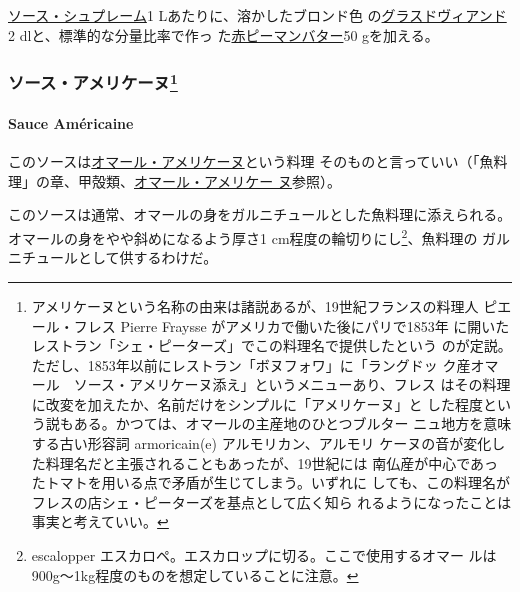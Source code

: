 \begin{recette}
\protect\hyperlink{sauce-supreme}{ソース・シュプレーム}1
Lあたりに、溶かしたブロンド色
の\protect\hyperlink{glace-de-viande}{グラスドヴィアンド}2
dlと、標準的な分量比率で作っ た\href{}{赤ピーマンバター}50 gを加える。

\maeaki

\hypertarget{ux30bdux30fcux30b9ux30a2ux30e1ux30eaux30b1ux30fcux30cc3}{%
\subsubsection[ソース・アメリケーヌ]{\texorpdfstring{ソース・アメリケーヌ\footnote{アメリケーヌという名称の由来は諸説あるが、19世紀フランスの料理人
  ピエール・フレス Pierre Fraysse がアメリカで働いた後にパリで1853年
  に開いたレストラン「シェ・ピーターズ」でこの料理名で提供したという
  のが定説。ただし、1853年以前にレストラン「ボヌフォワ」に「ラングドッ
  ク産オマール　ソース・アメリケーヌ添え」というメニューあり、フレス
  はその料理に改変を加えたか、名前だけをシンプルに「アメリケーヌ」と
  した程度という説もある。かつては、オマールの主産地のひとつブルター
  ニュ地方を意味する古い形容詞 armoricain(e) アルモリカン、アルモリ
  ケーヌの音が変化した料理名だと主張されることもあったが、19世紀には
  南仏産が中心であったトマトを用いる点で矛盾が生じてしまう。いずれに
  しても、この料理名がフレスの店シェ・ピーターズを基点として広く知ら
  れるようになったことは事実と考えていい。}}{ソース・アメリケーヌ}}\label{ux30bdux30fcux30b9ux30a2ux30e1ux30eaux30b1ux30fcux30cc3}}

\hypertarget{sauce-americaine}{%
\paragraph{Sauce Américaine}\label{sauce-americaine}}


このソースは\protect\hyperlink{homard-a-l-americaine}{オマール・アメリケーヌ}という料理
そのものと言っていい（「魚料理」の章、甲殻類、\protect\hyperlink{homard-a-l-americaine}{オマール・アメリケー
ヌ}参照）。

このソースは通常、オマールの身をガルニチュールとした魚料理に添えられる。
オマールの身をやや斜めになるよう厚さ1 cm程度の輪切りにし\footnote{escalopper
  エスカロペ。エスカロップに切る。ここで使用するオマー
  ルは900g〜1kg程度のものを想定していることに注意。}、魚料理の
ガルニチュールとして供するわけだ。


\end{recette}
